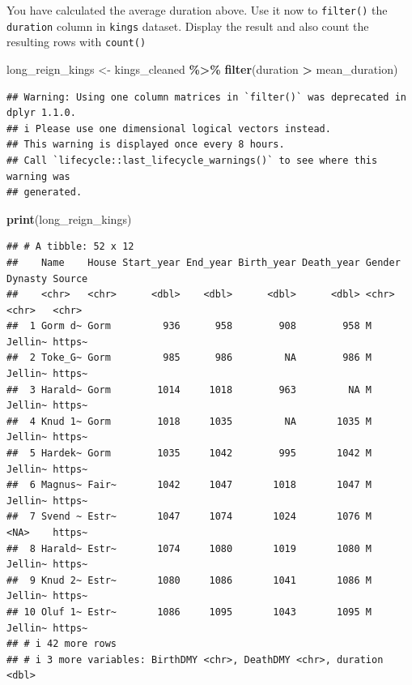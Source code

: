 \documentclass[
]{article}
\newenvironment{Shaded}{\begin{snugshade}}{\end{snugshade}}
\newcommand{\FunctionTok}[1]{\textcolor[rgb]{0.13,0.29,0.53}{\textbf{#1}}}
\newcommand{\NormalTok}[1]{#1}
\newcommand{\OtherTok}[1]{\textcolor[rgb]{0.56,0.35,0.01}{#1}}
\newcommand{\SpecialCharTok}[1]{\textcolor[rgb]{0.81,0.36,0.00}{\textbf{#1}}}
\begin{document}
You have calculated the average duration above. Use it now to
\texttt{filter()} the \texttt{duration} column in \texttt{kings}
dataset. Display the result and also count the resulting rows with
\texttt{count()}

\begin{Shaded}
\begin{Highlighting}[]
\NormalTok{long\_reign\_kings }\OtherTok{\textless{}{-}}\NormalTok{ kings\_cleaned }\SpecialCharTok{\%\textgreater{}\%}
  \FunctionTok{filter}\NormalTok{(duration }\SpecialCharTok{\textgreater{}}\NormalTok{ mean\_duration)}
\end{Highlighting}
\end{Shaded}

\begin{verbatim}
## Warning: Using one column matrices in `filter()` was deprecated in dplyr 1.1.0.
## i Please use one dimensional logical vectors instead.
## This warning is displayed once every 8 hours.
## Call `lifecycle::last_lifecycle_warnings()` to see where this warning was
## generated.
\end{verbatim}

\begin{Shaded}
\begin{Highlighting}[]
\FunctionTok{print}\NormalTok{(long\_reign\_kings)}
\end{Highlighting}
\end{Shaded}

\begin{verbatim}
## # A tibble: 52 x 12
##    Name    House Start_year End_year Birth_year Death_year Gender Dynasty Source
##    <chr>   <chr>      <dbl>    <dbl>      <dbl>      <dbl> <chr>  <chr>   <chr> 
##  1 Gorm d~ Gorm         936      958        908        958 M      Jellin~ https~
##  2 Toke_G~ Gorm         985      986         NA        986 M      Jellin~ https~
##  3 Harald~ Gorm        1014     1018        963         NA M      Jellin~ https~
##  4 Knud 1~ Gorm        1018     1035         NA       1035 M      Jellin~ https~
##  5 Hardek~ Gorm        1035     1042        995       1042 M      Jellin~ https~
##  6 Magnus~ Fair~       1042     1047       1018       1047 M      Jellin~ https~
##  7 Svend ~ Estr~       1047     1074       1024       1076 M      <NA>    https~
##  8 Harald~ Estr~       1074     1080       1019       1080 M      Jellin~ https~
##  9 Knud 2~ Estr~       1080     1086       1041       1086 M      Jellin~ https~
## 10 Oluf 1~ Estr~       1086     1095       1043       1095 M      Jellin~ https~
## # i 42 more rows
## # i 3 more variables: BirthDMY <chr>, DeathDMY <chr>, duration <dbl>
\end{verbatim}
\end{document}

